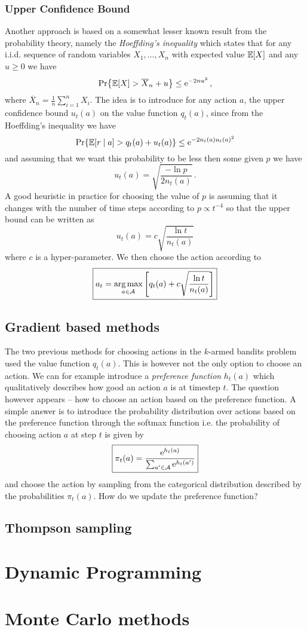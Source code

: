 \documentclass{myclass}
\begin{document}
\subsubsection{Upper Confidence Bound}

Another approach is based on a somewhat lesser known result from the probability theory, namely the
\emph{Hoeffding's inequality} which states that for any i.i.d. sequence of random variables
$X_1,\ldots,X_n$ with expected value $\mathbb{E}[X]$ and any $u \geq 0$ we have
\[
    \Pr{\mathbb{E}[X] > \overline{X}_n + u} \leq \mathrm{e}^{-2nu^2}\,,
\]
where $\displaystyle\overline{X}_n = \frac{1}{n} \sum_{i=1}^n X_i$. The idea is to introduce for any
action $a$, the upper confidence bound $u_t(a)$ on the value function $q_t(a)$, since from the
Hoeffding's inequality we have
\[
    \Pr{\mathbb{E}[r \mid a] > q_t(a) + u_t(a)} \leq \mathrm{e}^{-2 n_t(a) u_t(a)^2}
\]
and assuming that we want this probability to be less then some given $p$ we have
\[
    u_t(a) = \sqrt{\frac{-\ln p}{2 n_t(a)}}\,.
\]
A good heuristic in practice for choosing the value of $p$ is assuming that it changes with the
number of time steps according to $p \propto t^{-4}$ so that the upper bound can be written as
\[
\boxed
{
    u_t(a) = c \sqrt{\frac{\ln t}{n_t(a)}}
}
\]
where $c$ is a hyper-parameter. We then choose the action according to
\[
\boxed
{
    a_t = \operatorname*{arg\,max}_{a \in \mathcal{A}} \left[ q_t(a) + c \sqrt{\frac{\ln t}{n_t(a)}} \right]
}
\]


\subsection{Gradient based methods}

The two previous methods for choosing actions in the $k$-armed bandits problem used the value
function $q_t(a)$. This is however not the only option to choose an action. We can for example
introduce a \emph{preference function} $h_t(a)$ which qualitatively describes how good an action $a$
is at timestep $t$. The question however appears -- how to choose an action based on the preference
function. A simple answer is to introduce the probability distribution over actions based on the
preference function through the softmax function i.e. the probability of choosing action $a$ at step
$t$ is given by
\[
\boxed
{
    \pi_t(a) = \frac{\mathrm{e}^{h_t(a)}}{\sum_{a' \in \mathcal{A}} \mathrm{e}^{h_t(a')}}
}
\]
and choose the action by sampling from the categorical distribution described by the probabilities
$\pi_t(a)$. How do we update the preference function? 

\subsection{Thompson sampling}

\section{Dynamic Programming}

\section{Monte Carlo methods}
\end{document}
